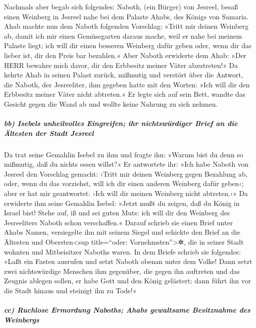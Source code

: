 Nachmals aber begab sich folgendes: Naboth, (ein Bürger)
von Jesreel, besaß einen Weinberg in Jesreel nahe bei dem Palaste Ahabs,
des Königs von Samaria. Ahab machte nun dem Naboth
folgenden Vorschlag: »Tritt mir deinen Weinberg ab, damit ich mir einen
Gemüsegarten daraus mache, weil er nahe bei meinem Palaste liegt; ich
will dir einen besseren Weinberg dafür geben oder, wenn dir das lieber
ist, dir den Preis bar bezahlen.« Aber Naboth erwiderte
dem Ahab: »Der HERR bewahre mich davor, dir den Erbbesitz meiner Väter
abzutreten!« Da kehrte Ahab in seinen Palast zurück,
mißmutig und verstört über die Antwort, die Naboth, der Jesreeliter, ihm
gegeben hatte mit den Worten: »Ich will dir den Erbbesitz meiner Väter
nicht abtreten.« Er legte sich auf sein Bett, wandte das Gesicht gegen
die Wand ab und wollte keine Nahrung zu sich nehmen.

\hypertarget{bb-isebels-unheilvolles-eingreifen-ihr-nichtswuxfcrdiger-brief-an-die-uxe4ltesten-der-stadt-jesreel}{%
\subparagraph{bb) Isebels unheilvolles Eingreifen; ihr nichtswürdiger
Brief an die Ältesten der Stadt
Jesreel}\label{bb-isebels-unheilvolles-eingreifen-ihr-nichtswuxfcrdiger-brief-an-die-uxe4ltesten-der-stadt-jesreel}}

Da trat seine Gemahlin Isebel zu ihm und fragte ihn:
»Warum bist du denn so mißmutig, daß du nichts essen willst?«
Er antwortete ihr: »Ich habe Naboth von Jesreel den
Vorschlag gemacht: ›Tritt mir deinen Weinberg gegen Bezahlung ab, oder,
wenn du das vorziehst, will ich dir einen anderen Weinberg dafür geben‹;
aber er hat mir geantwortet: ›Ich will dir meinen Weinberg nicht
abtreten.‹« Da erwiderte ihm seine Gemahlin Isebel: »Jetzt
mußt du zeigen, daß du König in Israel bist! Stehe auf, iß und sei guten
Muts: ich will dir den Weinberg des Jesreeliters Naboth schon
verschaffen.« Darauf schrieb sie einen Brief unter Ahabs
Namen, versiegelte ihn mit seinem Siegel und schickte den Brief an die
Ältesten und Obersten\textless sup title=``oder:
Vornehmsten''\textgreater✲, die in seiner Stadt wohnten und Mitbeisitzer
Naboths waren. In dem Briefe schrieb sie folgendes: »Laßt
ein Fasten ausrufen und setzt Naboth obenan unter dem Volke!
Dann setzt zwei nichtswürdige Menschen ihm gegenüber, die
gegen ihn auftreten und das Zeugnis ablegen sollen, er habe Gott und den
König gelästert; dann führt ihn vor die Stadt hinaus und steinigt ihn zu
Tode!«

\hypertarget{cc-ruchlose-ermordung-naboths-ahabs-gewaltsame-besitznahme-des-weinbergs}{%
\subparagraph{cc) Ruchlose Ermordung Naboths; Ahabs gewaltsame
Besitznahme des
Weinbergs}\label{cc-ruchlose-ermordung-naboths-ahabs-gewaltsame-besitznahme-des-weinbergs}}

